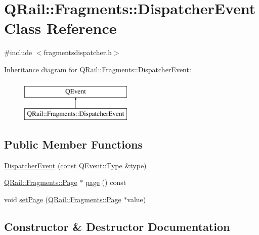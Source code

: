 \hypertarget{classQRail_1_1Fragments_1_1DispatcherEvent}{}\section{Q\+Rail\+::Fragments\+::Dispatcher\+Event Class Reference}
\label{classQRail_1_1Fragments_1_1DispatcherEvent}


{\ttfamily \#include $<$fragmentsdispatcher.\+h$>$}

Inheritance diagram for Q\+Rail\+::Fragments\+::Dispatcher\+Event\+:\begin{figure}[H]
\begin{center}
\leavevmode
\includegraphics[height=2.000000cm]{classQRail_1_1Fragments_1_1DispatcherEvent}
\end{center}
\end{figure}
\subsection*{Public Member Functions}
\begin{DoxyCompactItemize}
\item 
\mbox{\hyperlink{classQRail_1_1Fragments_1_1DispatcherEvent_ad98ef5840c2b15977eb5c5c92204342d}{Dispatcher\+Event}} (const Q\+Event\+::\+Type \&type)
\item 
\mbox{\hyperlink{classQRail_1_1Fragments_1_1Page}{Q\+Rail\+::\+Fragments\+::\+Page}} $\ast$ \mbox{\hyperlink{classQRail_1_1Fragments_1_1DispatcherEvent_a05e755262183efedfa43226a8ff3e752}{page}} () const
\item 
void \mbox{\hyperlink{classQRail_1_1Fragments_1_1DispatcherEvent_aa6808a5d6c31f9e9f86337493342f307}{set\+Page}} (\mbox{\hyperlink{classQRail_1_1Fragments_1_1Page}{Q\+Rail\+::\+Fragments\+::\+Page}} $\ast$value)
\end{DoxyCompactItemize}


\subsection{Constructor \& Destructor Documentation}
\mbox{\label{classQRail_1_1Fragments_1_1DispatcherEvent_ad98ef5840c2b15977eb5c5c92204342d}} 

